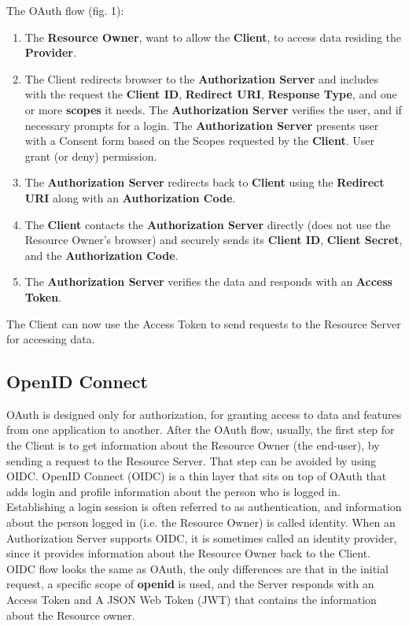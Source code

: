 	The OAuth flow (fig. 1):
	\begin{enumerate}
		\item The \textbf{Resource Owner}, want to allow the \textbf{Client}, to access data residing the \textbf{Provider}.
		
		\item The Client redirects browser to the \textbf{Authorization Server} and includes with the request the \textbf{Client ID}, \textbf{Redirect URI}, \textbf{Response Type}, and one or more \textbf{scopes} it needs. The \textbf{Authorization Server} verifies the user, and if necessary prompts for a login. The \textbf{Authorization Server} presents user with a Consent form based on the Scopes requested by the \textbf{Client}. User grant (or deny) permission.
		
		\item The \textbf{Authorization Server} redirects back to \textbf{Client} using the \textbf{Redirect URI} along with an \textbf{Authorization Code}.
		
		\item The \textbf{Client} contacts the \textbf{Authorization Server} directly (does not use the Resource Owner’s browser) and securely sends its \textbf{Client ID}, \textbf{Client Secret}, and the \textbf{Authorization Code}.
		
		\item The \textbf{Authorization Server} verifies the data and responds with an \textbf{Access Token}.
		
	\end{enumerate}
The Client can now use the Access Token to send requests to the Resource Server for accessing data.



\subsection{OpenID Connect}

OAuth is designed only for authorization, for granting access to data and features from one application to another. After the OAuth flow, usually, the first step for the Client is to get information about the Resource Owner (the end-user), by sending a request to the Resource Server. That step can be avoided by using OIDC.
OpenID Connect (OIDC) is a thin layer that sits on top of OAuth that adds login and profile information about the person who is logged in. Establishing a login session is often referred to as authentication, and information about the person logged in (i.e. the Resource Owner) is called identity. When an Authorization Server supports OIDC, it is sometimes called an identity provider, since it provides information about the Resource Owner back to the Client. OIDC flow looks the same as OAuth, the only differences are that in the initial request, a specific scope of \textbf{openid} is used, and the Server responds with an Access Token and A JSON Web Token (JWT) that contains the information about the Resource owner.

